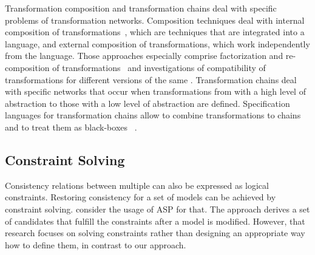 Transformation composition and transformation chains deal with specific problems of transformation networks.
Composition techniques deal with internal composition of transformations~\cite{wagelaar2008a}, which are techniques that are integrated into a language, and external composition of transformations, which work independently from the language.
Those approaches especially comprise factorization and re-composition of transformations~\cite{cuadrado2008a} and investigations of compatibility of transformations for different versions of the same \metamodels.
Transformation chains deal with specific networks that occur when transformations from \metamodels with a high level of abstraction to those with a low level of abstraction are defined.
Specification languages for transformation chains %
allow to combine transformations to chains~\cite{lucio2013a} and to treat them as black-boxes%
~\cite{vanhooff2006a, vanhooff2007a}. 


\subsection*{Constraint Solving}

Consistency relations between multiple \metamodels can also be expressed as logical constraints.
Restoring consistency for a set of models can be achieved by constraint solving.
\textcite{eramo2008a} consider the usage of \ac{ASP} for that. %
The approach derives a set of candidates that fulfill the constraints after a model is modified. %
However, that research focuses on solving constraints rather than designing an appropriate way how to define them, in contrast to our \commonalities approach.
